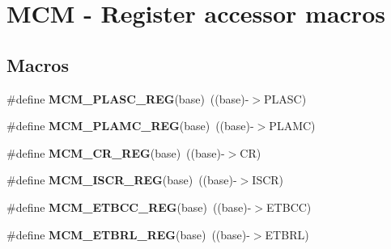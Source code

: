 \hypertarget{group__MCM__Register__Accessor__Macros}{}\section{M\+CM -\/ Register accessor macros}
\label{group__MCM__Register__Accessor__Macros}
\subsection*{Macros}
\begin{DoxyCompactItemize}
\item 
\#define {\bfseries M\+C\+M\+\_\+\+P\+L\+A\+S\+C\+\_\+\+R\+EG}(base)~((base)-\/$>$P\+L\+A\+SC)\hypertarget{group__MCM__Register__Accessor__Macros_ga5f5057d86df1e237371d76a2b99689ce}{}\label{group__MCM__Register__Accessor__Macros_ga5f5057d86df1e237371d76a2b99689ce}

\item 
\#define {\bfseries M\+C\+M\+\_\+\+P\+L\+A\+M\+C\+\_\+\+R\+EG}(base)~((base)-\/$>$P\+L\+A\+MC)\hypertarget{group__MCM__Register__Accessor__Macros_ga79ed4435da37b341c75f7372eb4f33f7}{}\label{group__MCM__Register__Accessor__Macros_ga79ed4435da37b341c75f7372eb4f33f7}

\item 
\#define {\bfseries M\+C\+M\+\_\+\+C\+R\+\_\+\+R\+EG}(base)~((base)-\/$>$CR)\hypertarget{group__MCM__Register__Accessor__Macros_ga2f348d51f03244728fb7f4a316d3cc01}{}\label{group__MCM__Register__Accessor__Macros_ga2f348d51f03244728fb7f4a316d3cc01}

\item 
\#define {\bfseries M\+C\+M\+\_\+\+I\+S\+C\+R\+\_\+\+R\+EG}(base)~((base)-\/$>$I\+S\+CR)\hypertarget{group__MCM__Register__Accessor__Macros_gadd1aaac56f7e4c12edb414c2dfa28937}{}\label{group__MCM__Register__Accessor__Macros_gadd1aaac56f7e4c12edb414c2dfa28937}

\item 
\#define {\bfseries M\+C\+M\+\_\+\+E\+T\+B\+C\+C\+\_\+\+R\+EG}(base)~((base)-\/$>$E\+T\+B\+CC)\hypertarget{group__MCM__Register__Accessor__Macros_ga3c776d91a9de72f61e403efa6ad6878d}{}\label{group__MCM__Register__Accessor__Macros_ga3c776d91a9de72f61e403efa6ad6878d}

\item 
\#define {\bfseries M\+C\+M\+\_\+\+E\+T\+B\+R\+L\+\_\+\+R\+EG}(base)~((base)-\/$>$E\+T\+B\+RL)\hypertarget{group__MCM__Register__Accessor__Macros_gafebd653a757e162cab456ccaae88b119}{}\label{group__MCM__Register__Accessor__Macros_gafebd653a757e162cab456ccaae88b119}


\end{DoxyCompactItemize}
